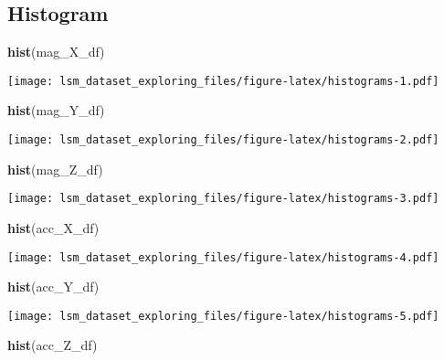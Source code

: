 \documentclass[]{article}
\newenvironment{Shaded}{\begin{snugshade}}{\end{snugshade}}
\newcommand{\KeywordTok}[1]{\textcolor[rgb]{0.13,0.29,0.53}{\textbf{#1}}}
\newcommand{\NormalTok}[1]{#1}
\begin{document}
\hypertarget{histogram}{%
\subsection{Histogram}\label{histogram}}

\begin{Shaded}
\begin{Highlighting}[]
\KeywordTok{hist}\NormalTok{(mag_X_df)}
\end{Highlighting}
\end{Shaded}

\texttt{[image: lsm\_dataset\_exploring\_files/figure-latex/histograms-1.pdf]}

\begin{Shaded}
\begin{Highlighting}[]
\KeywordTok{hist}\NormalTok{(mag_Y_df)}
\end{Highlighting}
\end{Shaded}

\texttt{[image: lsm\_dataset\_exploring\_files/figure-latex/histograms-2.pdf]}

\begin{Shaded}
\begin{Highlighting}[]
\KeywordTok{hist}\NormalTok{(mag_Z_df)}
\end{Highlighting}
\end{Shaded}

\texttt{[image: lsm\_dataset\_exploring\_files/figure-latex/histograms-3.pdf]}

\begin{Shaded}
\begin{Highlighting}[]
\KeywordTok{hist}\NormalTok{(acc_X_df)}
\end{Highlighting}
\end{Shaded}

\texttt{[image: lsm\_dataset\_exploring\_files/figure-latex/histograms-4.pdf]}

\begin{Shaded}
\begin{Highlighting}[]
\KeywordTok{hist}\NormalTok{(acc_Y_df)}
\end{Highlighting}
\end{Shaded}

\texttt{[image: lsm\_dataset\_exploring\_files/figure-latex/histograms-5.pdf]}

\begin{Shaded}
\begin{Highlighting}[]
\KeywordTok{hist}\NormalTok{(acc_Z_df)}
\end{Highlighting}
\end{Shaded}
\end{document}
